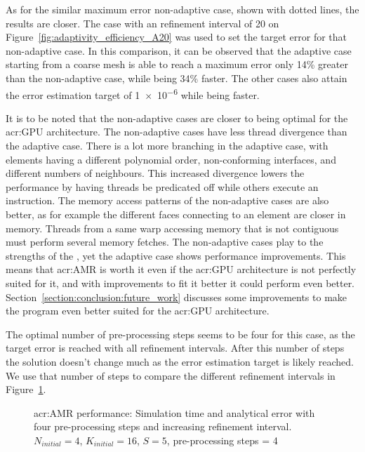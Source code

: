 As for the similar maximum error non-adaptive case, shown with dotted lines, the results are closer.
The case with an refinement interval of 20 on Figure~\ref{fig:adaptivity_efficiency_A20} was used to
set the target error for that non-adaptive case. In this comparison, it can be observed that the
adaptive case starting from a coarse mesh is able to reach a maximum error only 14\% greater than
the non-adaptive case, while being 34\% faster. The other cases also attain the error estimation
target of \num{1e-6} while being faster.

It is to be noted that the non-adaptive cases are closer to being optimal for the \acrshort{acr:GPU}
architecture. The non-adaptive cases have less thread divergence than the adaptive case. There is a
lot more branching in the adaptive case, with elements having a different polynomial order,
non-conforming interfaces, and different numbers of neighbours. This increased divergence lowers the
performance by having threads be predicated off while others execute an instruction. The memory
access patterns of the non-adaptive cases are also better, as for example the different faces
connecting to an element are closer in memory. Threads from a same warp accessing memory that is not
contiguous must perform several memory fetches. The non-adaptive cases play to the strengths of the
, yet the adaptive case shows performance improvements. This means that
\acrshort{acr:AMR} is worth it even if the \acrshort{acr:GPU} architecture is not perfectly suited
for it, and with improvements to fit it better it could perform even better.
Section~\ref{section:conclusion:future_work} discusses some improvements to make the program even
better suited for the \acrshort{acr:GPU} architecture.

The optimal number of pre-processing steps seems to be four for this case, as the target error is
reached with all refinement intervals. After this number of steps the solution doesn't change much
as the error estimation target is likely reached. We use that number of steps to compare the
different refinement intervals in Figure~\ref{fig:adaptivity_efficiency_C4}.

\begin{figure}[H]
	\centering
	\hfill
	\caption{\Acrlong{acr:AMR} performance: Simulation time and analytical error with four pre-processing steps and increasing refinement interval. \(N_{initial} = 4\), \(K_{initial} = 16\), \(S = 5\), pre-processing steps = 4}\label{fig:adaptivity_efficiency_C4}
\end{figure}

